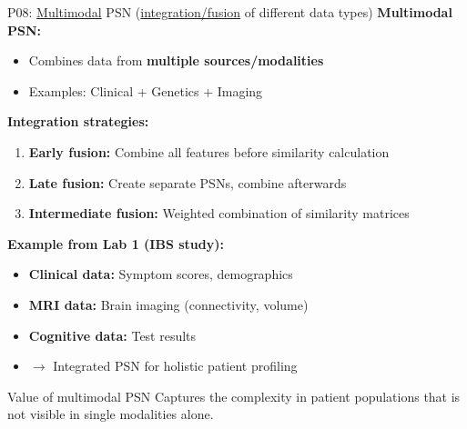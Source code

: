 \documentclass[aspectratio=169, 10pt]{beamer}
\begin{document}
\begin{frame}{P08: \href{https://en.wikipedia.org/wiki/Multimodal_learning}{Multimodal} PSN (\href{https://en.wikipedia.org/wiki/Data_fusion}{integration/fusion} of different data types)}
    \textbf{Multimodal PSN:}
    \begin{itemize}\setlength{\itemsep}{0pt}
        \item Combines data from \textbf{multiple sources/modalities}
        \item Examples: Clinical + Genetics + Imaging
    \end{itemize}
    
    \vspace{1mm}
    \textbf{Integration strategies:}
    \begin{enumerate}\setlength{\itemsep}{0pt}
        \item \textbf{Early fusion:} Combine all features before similarity calculation
        \item \textbf{Late fusion:} Create separate PSNs, combine afterwards
        \item \textbf{Intermediate fusion:} Weighted combination of similarity matrices
    \end{enumerate}
    
    \vspace{1mm}
    \footnotesize
    \textbf{Example from Lab 1 (IBS study):}
    \begin{itemize}\setlength{\itemsep}{0pt}
        \item \textbf{Clinical data:} Symptom scores, demographics
        \item \textbf{MRI data:} Brain imaging (connectivity, volume)
        \item \textbf{Cognitive data:} Test results
        \item $\rightarrow$ Integrated PSN for holistic patient profiling
    \end{itemize}
    \normalsize
    
    \vspace{-1mm}
    \begin{block}{\footnotesize Value of multimodal PSN}
        \footnotesize Captures the complexity in patient populations that is not visible in single modalities alone.
    \end{block}
\end{frame}

\end{document}
